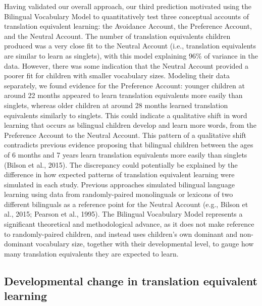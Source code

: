 \documentclass[
  english,
  ,man,floatsintext]{apa6}
\begin{document}
Having validated our overall approach, our third prediction motivated using the Bilingual Vocabulary Model to quantitatively test three conceptual accounts of translation equivalent learning: the Avoidance Account, the Preference Account, and the Neutral Account. The number of translation equivalents children produced was a very close fit to the Neutral Account (i.e., translation equivalents are similar to learn as singlets), with this model explaining 96\% of variance in the data. However, there was some indication that the Neutral Account provided a poorer fit for children with smaller vocabulary sizes. Modeling their data separately, we found evidence for the Preference Account: younger children at around 22 months appeared to learn translation equivalents more easily than singlets, whereas older children at around 28 months learned translation equivalents similarly to singlets. This could indicate a qualitative shift in word learning that occurs as bilingual children develop and learn more words, from the Preference Account to the Neutral Account. This pattern of a qualitative shift contradicts previous evidence proposing that bilingual children between the ages of 6 months and 7 years learn translation equivalents more easily than singlets (Bilson et al., 2015). The discrepancy could potentially be explained by the difference in how expected patterns of translation equivalent learning were simulated in each study. Previous approaches simulated bilingual language learning using data from randomly-paired monolinguals or lexicons of two different bilinguals as a reference point for the Neutral Account (e.g., Bilson et al., 2015; Pearson et al., 1995). The Bilingual Vocabulary Model represents a significant theoretical and methodological advance, as it does not make reference to randomly-paired children, and instead uses children's own dominant and non-dominant vocabulary size, together with their developmental level, to gauge how many translation equivalents they are expected to learn.

\hypertarget{developmental-change-in-translation-equivalent-learning}{%
\subsection{Developmental change in translation equivalent learning}\label{developmental-change-in-translation-equivalent-learning}}
\end{document}
